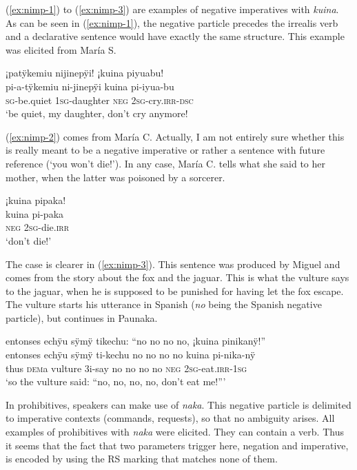 (\ref{ex:nimp-1}) to (\ref{ex:nimp-3}) are examples of negative imperatives with \textit{kuina}. As can be seen in (\ref{ex:nimp-1}), the negative particle precedes the irrealis verb and a declarative sentence would have exactly the same structure. This example was elicited from María S.

\ea\label{ex:nimp-1}
\begingl
\glpreamble ¡patÿkemiu nijinepÿi! ¡kuina piyuabu!\\
\gla pi-a-tÿkemiu ni-jinepÿi kuina pi-iyua-bu\\
\textsc{sg}-be.quiet 1\textsc{sg}-daughter \textsc{neg} 2\textsc{sg}-cry.\textsc{irr}-\textsc{dsc}\\
\glft ‘be quiet, my daughter, don’t cry anymore!
\endgl
\trailingcitation{[mrx-e150219s.136]}
\xe

(\ref{ex:nimp-2}) comes from María C. Actually, I am not entirely sure whether this is really meant to be a negative imperative or rather a sentence with future reference (‘you won’t die!’). In any case, María C. tells what she said to her mother, when the latter was poisoned by a sorcerer.

\ea\label{ex:nimp-2}
\begingl
\glpreamble ¡kuina pipaka!\\
\gla kuina pi-paka\\
\glb \textsc{neg} 2\textsc{sg}-die.\textsc{irr}\\
\glft ‘don’t die!’
\endgl
\trailingcitation{[ump-p110815sf.465]}
\xe

The case is clearer in (\ref{ex:nimp-3}). This sentence was produced by Miguel and comes from the story about the fox and the jaguar. This is what the vulture says to the jaguar, when he is supposed to be punished for having let the fox escape. The vulture starts his utterance in Spanish (\textit{no} being the Spanish negative particle), but continues in Paunaka.

\ea\label{ex:nimp-3}
\begingl
\glpreamble entonses echÿu sÿmÿ tikechu: “no no no no, ¡kuina pinikanÿ!”\\
\gla entonses echÿu sÿmÿ ti-kechu {no no no no} kuina pi-nika-nÿ\\
\glb thus \textsc{dem}a vulture 3i-say {no no no no} \textsc{neg} 2\textsc{sg}-eat.\textsc{irr}-1\textsc{sg}\\
\glft ‘so the vulture said: “no, no, no, no, don’t eat me!”’
\endgl
\trailingcitation{[jmx-n120429ls-x5.180]}
\xe

In prohibitives, speakers can make use of \textit{naka}. This negative particle is delimited to imperative contexts (commands, requests), so that no ambiguity arises. All examples of prohibitives with \textit{naka} were elicited. They can contain a  verb. Thus it seems that the fact that two parameters trigger  here, negation and imperative, is encoded by using the RS marking that matches none of them. 

